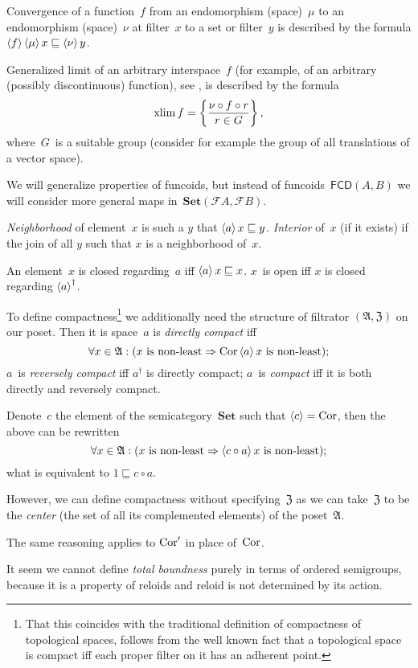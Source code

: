 Convergence of a function~$f$ from an endomorphism (space)~$\mu$ to an endomorphism (space)~$\nu$ at filter~$x$ to a set or filter~$y$ is described by the formula $\left\langle f\right\rangle\left\langle \mu\right\rangle x\sqsubseteq\left\langle \nu\right\rangle y$.

Generalized limit of an arbitrary interspace~$f$ (for example, of an arbitrary (possibly discontinuous) function), see \cite{limit}, is described by the formula \[ \operatorname{xlim} f=\left\{ \frac{\nu\circ f\circ r}{r\in G}\right\}, \]
where~$G$~is a suitable group (consider for example the group of all translations of a vector space).

We will generalize properties of funcoids, but instead of funcoids~$\mathsf{FCD}(A,B)$ we will consider more general maps in~$\mathbf{Set}(\mathscr{F}A,\mathscr{F}B)$.

\emph{Neighborhood} of element~$x$ is such a $y$ that $\left\langle a\right\rangle x\sqsubseteq y$. \emph{Interior} of~$x$ (if it exists) if the join of all $y$ such that $x$ is a neighborhood of~$x$.

An element~$x$ is closed regarding~$a$ iff $\left\langle a\right\rangle x\sqsubseteq x$. $x$~is open iff $x$ is closed regarding $\left\langle a\right\rangle^{\dagger}$.

To define compactness\footnote{That this coincides with the traditional definition of compactness of topological spaces, follows from the well known fact that a topological space is compact iff each proper filter on it has an adherent point.} we additionally need the structure of filtrator $(\mathfrak{A},\mathfrak{Z})$ on our poset. Then it is space~$a$ is \emph{directly compact} iff
\[\forall x\in\mathfrak{A}:(x\text{ is non-least}\Rightarrow\operatorname{Cor}\left\langle a\right\rangle x\text{ is non-least}); \]
$a$~is \emph{reversely compact} iff $a^{\dagger}$ is directly compact; $a$~is \emph{compact} iff it is both directly and reversely compact.

Denote~$c$ the element of the semicategory~$\mathbf{Set}$ such that
$\left\langle c\right\rangle=\operatorname{Cor}$, then the above can be rewritten
\[\forall x\in\mathfrak{A}:(x\text{ is non-least}\Rightarrow\left\langle c\circ a\right\rangle x\text{ is non-least}); \]
what is equivalent to $1 \sqsubseteq c\circ a$.

However, we can define compactness without specifying~$\mathfrak{Z}$ as we can take~$\mathfrak{Z}$ to be the \emph{center} (the set of all its complemented elements) of the poset~$\mathfrak{A}$.

The same reasoning applies to $\operatorname{Cor}'$ in place of~$\operatorname{Cor}$.

It seem we cannot define \emph{total boundness} purely in terms of ordered semigroups, because it is a property of reloids and reloid is not determined by its action.

